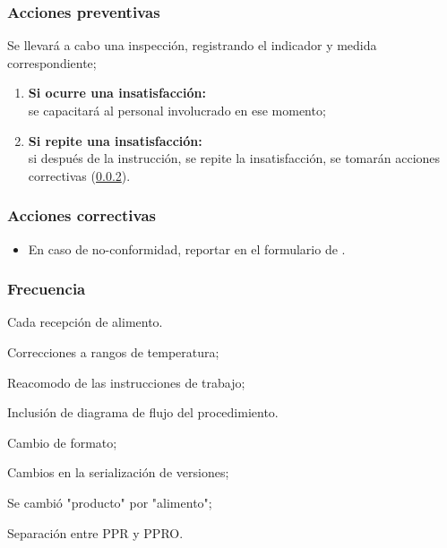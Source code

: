 \subsubsection{Acciones preventivas}
	Se llevará a cabo una inspección, registrando el indicador y medida correspondiente;
	\begin{enumerate}
		\item \textbf{Si ocurre una insatisfacción:}\\ se capacitará al personal involucrado en ese momento;
		\item \textbf{Si repite una insatisfacción:}\\ si después de la instrucción, se repite la insatisfacción, se tomarán acciones correctivas (\cref{sec:2.1:acc}).
	\end{enumerate}

\subsubsection{Acciones correctivas}\label{sec:2.1:acc}
\begin{itemize}
	\item En caso de no-conformidad, reportar en el formulario de \RAC.
\end{itemize}

\subsubsection{Frecuencia}

Cada recepción de \gls{alimento}.

\begin{changelog}[title=Registro de cambios,simple, sectioncmd=\subsection*]
	\begin{version}[v=2.1, date=2023--07, author=Pablo E. Alanis]
		\item Correcciones a rangos de temperatura;
		\item Reacomodo de las instrucciones de trabajo;
		\item Inclusión de diagrama de flujo del procedimiento.
	\end{version}

	\begin{version}[v=2.0, date=2023--01, author=Pablo E. Alanis]
		\item Cambio de formato;
		\item Cambios en la serialización de versiones;
		\item Se cambió "producto" por "alimento";
		\item Separación entre PPR y PPRO.
	\end{version}
\end{changelog}
